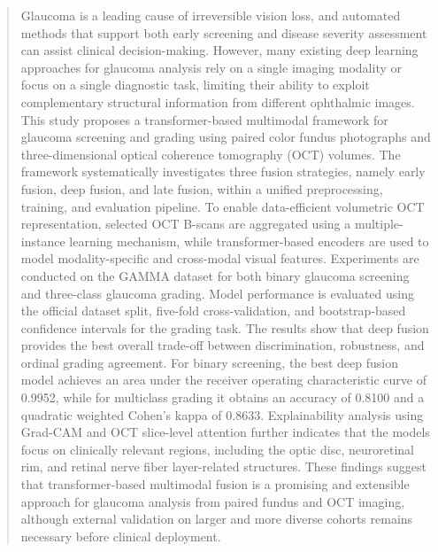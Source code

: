 \documentclass[preprint,12pt]{elsarticle}
\begin{document}
\begin{frontmatter}
    \begin{abstract}
        Glaucoma is a leading cause of irreversible vision loss, and automated methods that support both early screening and disease severity assessment can assist clinical decision-making. However, many existing deep learning approaches for glaucoma analysis rely on a single imaging modality or focus on a single diagnostic task, limiting their ability to exploit complementary structural information from different ophthalmic images. This study proposes a transformer-based multimodal framework for glaucoma screening and grading using paired color fundus photographs and three-dimensional optical coherence tomography (OCT) volumes. The framework systematically investigates three fusion strategies, namely early fusion, deep fusion, and late fusion, within a unified preprocessing, training, and evaluation pipeline. To enable data-efficient volumetric OCT representation, selected OCT B-scans are aggregated using a multiple-instance learning mechanism, while transformer-based encoders are used to model modality-specific and cross-modal visual features. Experiments are conducted on the GAMMA dataset for both binary glaucoma screening and three-class glaucoma grading. Model performance is evaluated using the official dataset split, five-fold cross-validation, and bootstrap-based confidence intervals for the grading task. The results show that deep fusion provides the best overall trade-off between discrimination, robustness, and ordinal grading agreement. For binary screening, the best deep fusion model achieves an area under the receiver operating characteristic curve of 0.9952, while for multiclass grading it obtains an accuracy of 0.8100 and a quadratic weighted Cohen's kappa of 0.8633. Explainability analysis using Grad-CAM and OCT slice-level attention further indicates that the models focus on clinically relevant regions, including the optic disc, neuroretinal rim, and retinal nerve fiber layer-related structures. These findings suggest that transformer-based multimodal fusion is a promising and extensible approach for glaucoma analysis from paired fundus and OCT imaging, although external validation on larger and more diverse cohorts remains necessary before clinical deployment.
    \end{abstract}

    \begin{graphicalabstract}
    \end{graphicalabstract}


\end{frontmatter}
\end{document}
